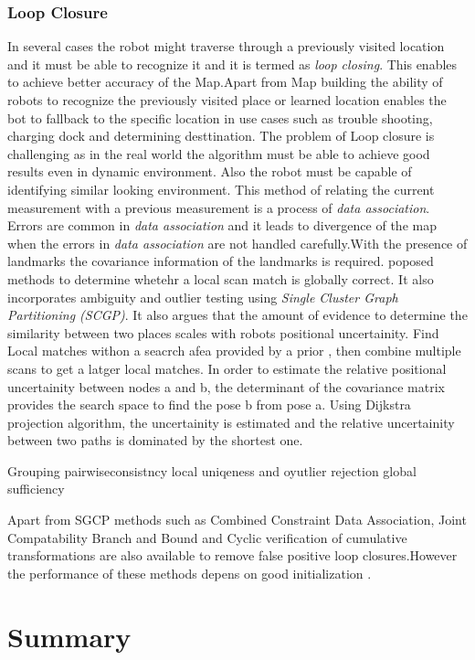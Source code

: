 \subsubsection{Loop Closure}
In several cases the robot might traverse through a previously visited location and it must be able to recognize it and it is termed as \textit{loop closing}. This enables to 
achieve better accuracy of the Map.Apart from Map building the ability of robots to recognize the previously visited place or learned location enables the bot to fallback to 
the specific location in use cases such as trouble shooting, charging dock and determining desttination. 
The problem of Loop closure is challenging as in the real world the algorithm must be able to achieve good results even in dynamic environment. Also the robot must be capable 
of identifying similar looking environment. This method of relating the current measurement with a previous measurement is a process of \textit{data association}. Errors are 
common in \textit{data association} and it leads to divergence of the map when the errors in \textit{data association} are not handled carefully.With the presence of landmarks 
the covariance information of the landmarks is required.
\cite{E.Olson/LocalSM} poposed methods to determine whetehr a local scan match is globally correct. It also incorporates ambiguity and outlier testing using 
\textit{Single Cluster Graph Partitioning (SCGP)}. It also argues that the amount of evidence to determine the similarity between two places scales with robots positional uncertainity.
Find Local matches withon a seacrch afea provided by a prior , then combine multiple scans to get a latger local matches.
In order to estimate the relative positional uncertainity between nodes a and b, the determinant of the covariance matrix provides the search space to find the pose b from pose a.
Using Dijkstra projection algorithm, the uncertainity is estimated and the relative uncertainity between two paths is dominated by the shortest one. 

Grouping
pairwiseconsistncy
local uniqeness and oyutlier rejection
global sufficiency

Apart from SGCP methods such as Combined Constraint Data Association, Joint Compatability Branch and Bound and Cyclic verification of cumulative transformations are also available
to remove false positive loop closures.However the performance of these methods depens on good initialization \cite{P.Agarwal}.
\section{Summary}